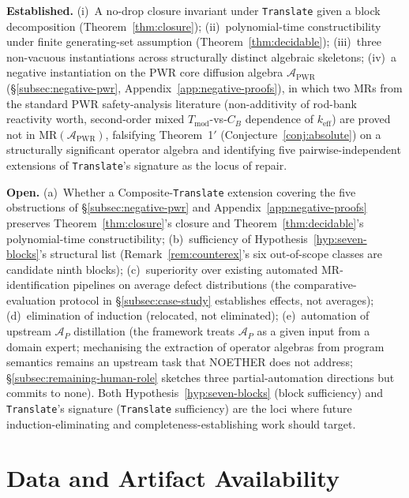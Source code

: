 \documentclass[manuscript]{acmart}
\begin{document}
\begin{tcolorbox}[breakable,colback=gray!5,colframe=black!50,arc=2pt,boxrule=0.5pt,fontupper=\small,title=Established and open,fonttitle=\small\bfseries]
\textbf{Established.} (i)~A no-drop closure invariant under \texttt{Translate}
given a block decomposition (Theorem~\ref{thm:closure}); (ii)~polynomial-time
constructibility under finite generating-set assumption (Theorem~\ref{thm:decidable});
(iii)~three non-vacuous instantiations across structurally distinct algebraic
skeletons; (iv)~a negative instantiation on the PWR core diffusion algebra
$\mathcal{A}_{\mathrm{PWR}}$ (\S\ref{subsec:negative-pwr},
Appendix~\ref{app:negative-proofs}), in which two MRs from the standard PWR
safety-analysis literature (non-additivity of rod-bank reactivity worth,
second-order mixed $T_{\mathrm{mod}}$-vs-$C_B$ dependence of $k_{\mathrm{eff}}$)
are proved not in $\mathrm{MR}(\mathcal{A}_{\mathrm{PWR}})$, falsifying
Theorem~1$'$ (Conjecture~\ref{conj:absolute}) on a structurally significant
operator algebra and identifying five pairwise-independent extensions of
\texttt{Translate}'s signature as the locus of repair.

\textbf{Open.} (a)~Whether a Composite-\texttt{Translate} extension covering the five obstructions of \S\ref{subsec:negative-pwr} and Appendix~\ref{app:negative-proofs} preserves Theorem~\ref{thm:closure}'s closure and Theorem~\ref{thm:decidable}'s polynomial-time constructibility; (b)~sufficiency of Hypothesis~\ref{hyp:seven-blocks}'s structural list (Remark~\ref{rem:counterex}'s six out-of-scope classes are candidate ninth blocks); (c)~superiority over existing automated MR-identification pipelines on average defect distributions (the comparative-evaluation protocol in \S\ref{subsec:case-study} establishes effects, not averages); (d)~elimination of induction (relocated, not eliminated); (e)~automation of upstream $\mathcal{A}_P$ distillation (the framework treats $\mathcal{A}_P$ as a given input from a domain expert; mechanising the extraction of operator algebras from program semantics remains an upstream task that NOETHER does not address; \S\ref{subsec:remaining-human-role} sketches three partial-automation directions but commits to none). Both Hypothesis~\ref{hyp:seven-blocks} (block sufficiency) and \texttt{Translate}'s signature (\texttt{Translate} sufficiency) are the loci where future induction-eliminating and completeness-establishing work should target.
\end{tcolorbox}

\section{Data and Artifact Availability}
\label{subsec:artefact}
\end{document}
